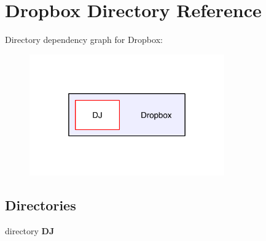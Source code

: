 \section{Dropbox Directory Reference}
\label{dir_e2c88a9c3d830e594a88bfb657bfbe66}
Directory dependency graph for Dropbox\-:
\nopagebreak
\begin{figure}[H]
\begin{center}
\leavevmode
\includegraphics[width=238pt]{dir_e2c88a9c3d830e594a88bfb657bfbe66_dep}
\end{center}
\end{figure}
\subsection*{Directories}
\begin{DoxyCompactItemize}
\item 
directory {\bf D\-J}
\end{DoxyCompactItemize}
